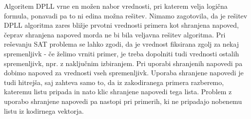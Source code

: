 \documentclass[12pt,a4paper,twoside]{article}
\theoremstyle{definition} %
\theoremstyle{plain} %
\numberwithin{equation}{section}  %
\begin{document}
Algoritem DPLL vrne en možen nabor vrednosti, pri katerem velja logična formula, ponavadi pa to ni edina možna rešitev.
Nimamo zagotovila, da je rešitev DPLL algoritma zares bližje prvotni vrednosti primera kot shranjena napoved, čeprav shranjena napoved morda ne bi bila veljavna rešitev algoritma.
Pri reševanju SAT problema se lahko zgodi, da je vrednost fiksirana zgolj za nekaj spremenljivk - če želimo vrniti primer, je treba dopolniti tudi vrednosti ostalih spremenljivk, npr. z naključnim izbiranjem.
Pri uporabi shranjenih napovedi pa dobimo napoved za vrednosti vseh spremenljivk.
Uporaba shranjene napovedi je tudi hitrejša, saj zahteva samo to, da iz zakodiranega primera razberemo, kateremu listu pripada in nato klic shranjene napovedi tega lista.
Problem z uporabo shranjene napovedi pa nastopi pri primerih, ki ne pripadajo nobenemu listu iz kodirnega vektorja.

\end{document}
